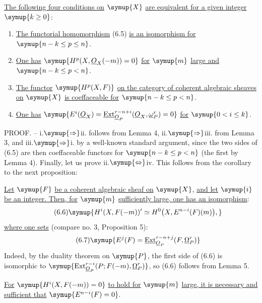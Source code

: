  \uline{The following four conditions on} $\symup{X}$ \uline{are equivalent for
a given integer} $\symup{k\geq0}$:
\begin{enumerate}
  \item[\textnormal{i.}] \uline{The functorial homomorphism} (6.5) \uline{is an isomorphism for}
    $\symup{n-k\leq p\leq n}$.
  \item[\textnormal{ii.}] \uline{One has} $\symup{H^{p}(X,\Osh_X(-m))=0}$ \uline{for} $\symup{m}$ \uline{large and}
    $\symup{n-k\leq p<n}$.
  \item[\textnormal{iii.}] \uline{The functor} $\symup{H^{p}(X,F)}$ \uline{on the category of coherent
    algebraic sheaves on} $\symup{X}$ \uline{is coeffaceable for} $\symup{n-k\leq p<n}$.
  \item[\textnormal{iv.}] \uline{One has}
    $\symup{E^{i}(\Osh_X)=\Extsh_{\Osh_P}^{r-n+i}(\Osh_X,\underline{\omega}_P^{r})=0}$
    \uline{for} $\symup{0<i\leq k}$.
\end{enumerate}

\noindent PROOF. -- \textnormal{i.}$\symup{\Rightarrow}$\textnormal{ii.} follows
from Lemma 4, \textnormal{ii.}$\symup{\Rightarrow}$\textnormal{iii.} from Lemma 3, and
\textnormal{iii.}$\symup{\Rightarrow}$\textnormal{i.} by a well-known standard argument, since
the two sides of (6.5) are then coeffaceable functors for $\symup{n-k\leq p<n}$ (the
first by Lemma 4). Finally, let us prove
\textnormal{ii.}$\symup{\Leftrightarrow}$\textnormal{iv.} This follows from the corollary to the
next proposition:

 \uline{Let} $\symup{F}$ \uline{be a coherent algebraic sheaf on} $\symup{X}$, \uline{and let}
$\symup{i}$ \uline{be an integer. Then, for} $\symup{m}$ \uline{sufficiently large, one has an isomorphism}:
\begin{equation}\tag{6.6}
  \symup{H^{i}(X,F(-m))'
  \simeq H^{0}\bigl(X,E^{n-i}(F)(m)\bigr),}
\end{equation}
\uline{where one sets} (compare no. 3, Proposition 5):
\begin{equation}\tag{6.7}
  \symup{E^{j}(F)=\Extsh_{\Osh_P}^{r-n+j}(F,\underline{\Omega}_P^{r})}
\end{equation}
Indeed, by the duality theorem on $\symup{P}$, the first side of (6.6) is isomorphic to
$\symup{\operatorname{Ext}_{\Osh_P}^{r-i}(P;F(-m),\underline{\Omega}_P^{r})}$, so (6.6) follows
from Lemma 5.

 \uline{For} $\symup{H^{i}(X,F(-m))=0}$ \uline{to hold for} $\symup{m}$ \uline{large, it is necessary and sufficient that}
$\symup{E^{n-i}(F)=0}$.

